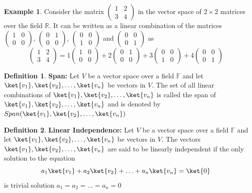 \documentclass[12pt, oneside]{book}
\theoremstyle{definition}
\newtheorem{definition}{Definition}[section]
\theoremstyle{definition}
\newtheorem{example}{Example}[section]
\theoremstyle{remark}
\begin{document}
\begin{example}
    Consider the matrix $\begin{pmatrix} 1 & 2 \\ 3 & 4 \end{pmatrix}$ in the vector space of $2\times 2$ matrices over the field $\mathbb{R}$. It can be written as a linear combination of the matrices
    $\begin{pmatrix} 1 & 0 \\ 0 & 0 \end{pmatrix}$, $\begin{pmatrix} 0 & 1 \\ 0 & 0 \end{pmatrix}$, $\begin{pmatrix} 0 & 0 \\ 1 & 0 \end{pmatrix}$ and $\begin{pmatrix} 0 & 0 \\ 0 & 1 \end{pmatrix}$ as
    \[
        \begin{pmatrix} 1 & 2 \\ 3 & 4 \end{pmatrix}=1\begin{pmatrix} 1 & 0 \\ 0 & 0 \end{pmatrix}+2\begin{pmatrix} 0 & 1 \\ 0 & 0 \end{pmatrix}+3\begin{pmatrix} 0 & 0 \\ 1 & 0 \end{pmatrix}+4\begin{pmatrix} 0 & 0 \\ 0 & 1 \end{pmatrix}
    \]
\end{example}

\begin{definition}
    \textbf{Span:} Let $V$ be a vector space over a field $\mathbb{F}$ and 
    let $\ket{v_1},\ket{v_2},\ldots,\ket{v_n}$ be vectors in $V$. 
    The set of all linear combinations of $\ket{v_1},\ket{v_2},\ldots,\ket{v_n}$ 
    is called the span of $\ket{v_1},\ket{v_2},\ldots,\ket{v_n}$ 
    and is denoted by $Span(\ket{v_1},\ket{v_2},\ldots,\ket{v_n})$
\end{definition}

\begin{definition}
    \textbf{Linear Independence:} Let $V$ be a vector space over a field $\mathbb{F}$ and let $\ket{v_1},\ket{v_2},\ldots,\ket{v_n}$ be vectors in $V$. The vectors $\ket{v_1},\ket{v_2},\ldots,\ket{v_n}$ are said to be linearly independent if the only solution to the equation
    \begin{equation}
        a_1\ket{v_1}+a_2\ket{v_2}+\ldots+a_n\ket{v_n}=\ket{0}
        \label{eq:Linear Independence}
    \end{equation}
    is trivial solution $a_1=a_2=\ldots=a_n=0$
\end{definition}
\end{document}
